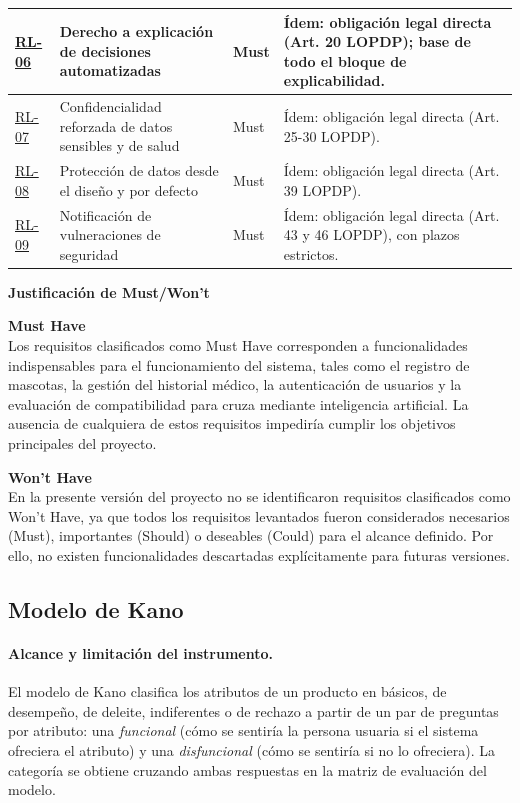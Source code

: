 \documentclass[journal,onecolumn]{IEEEtran}
\begin{document}
\begin{longtable}{@{}p{1.6cm} p{4.8cm} p{1.6cm} p{5.2cm}@{}}
		\hline
		\hyperref[rl:06]{RL-06} & Derecho a explicación de decisiones automatizadas & Must & Ídem: obligación legal directa (Art. 20 LOPDP); base de todo el bloque de explicabilidad. \\
		\hline
		\hyperref[rl:07]{RL-07} & Confidencialidad reforzada de datos sensibles y de salud & Must & Ídem: obligación legal directa (Art. 25-30 LOPDP). \\
		\hline
		\hyperref[rl:08]{RL-08} & Protección de datos desde el diseño y por defecto & Must & Ídem: obligación legal directa (Art. 39 LOPDP). \\
		\hline
		\hyperref[rl:09]{RL-09} & Notificación de vulneraciones de seguridad & Must & Ídem: obligación legal directa (Art. 43 y 46 LOPDP), con plazos estrictos. \\
	\end{longtable}
	
	\textbf{Justificación de Must/Won't}
	
	\textbf{Must Have} \\
	Los requisitos clasificados como Must Have corresponden a funcionalidades
	indispensables para el funcionamiento del sistema, tales como el registro de
	mascotas, la gestión del historial médico, la autenticación de usuarios y la
	evaluación de compatibilidad para cruza mediante inteligencia artificial. La
	ausencia de cualquiera de estos requisitos impediría cumplir los objetivos
	principales del proyecto.
	
	\textbf{Won't Have} \\
	En la presente versión del proyecto no se identificaron requisitos
	clasificados como Won't Have, ya que todos los requisitos levantados fueron
	considerados necesarios (Must), importantes (Should) o deseables (Could) para
	el alcance definido. Por ello, no existen funcionalidades descartadas
	explícitamente para futuras versiones.
	
	\subsection{Modelo de Kano}
	\label{sec:kano}
	
	\paragraph{Alcance y limitación del instrumento.}
	El modelo de Kano \cite{kano1984} clasifica los atributos de un producto en
	básicos, de desempeño, de deleite, indiferentes o de rechazo a partir de un
	par de preguntas por atributo: una \emph{funcional} (cómo se sentiría la
	persona usuaria si el sistema ofreciera el atributo) y una
	\emph{disfuncional} (cómo se sentiría si no lo ofreciera). La categoría se
	obtiene cruzando ambas respuestas en la matriz de evaluación del modelo.
	
\end{document}
